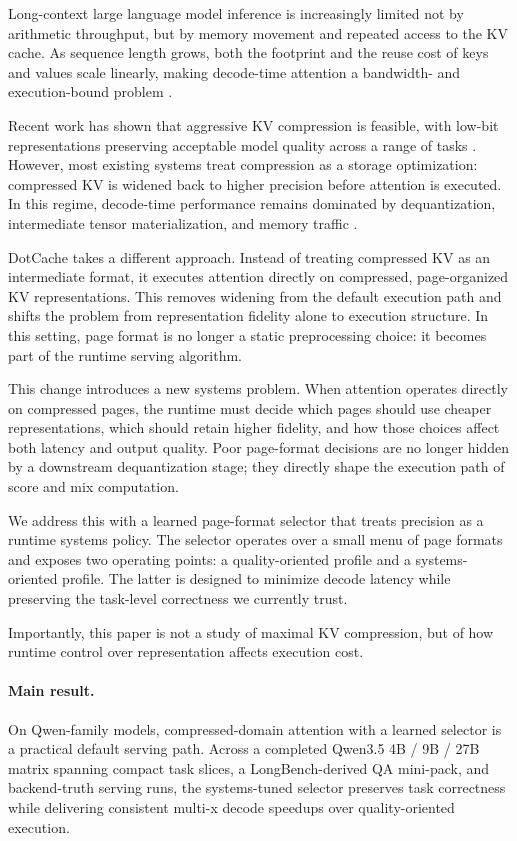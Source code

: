 \documentclass[11pt]{article}
\begin{document}
Long-context large language model inference is increasingly limited not by arithmetic throughput, but by memory movement and repeated access to the KV cache. As sequence length grows, both the footprint and the reuse cost of keys and values scale linearly, making decode-time attention a bandwidth- and execution-bound problem \cite{pagedattention,flashattention,flashattention2,llm_kv_survey}.

Recent work has shown that aggressive KV compression is feasible, with low-bit representations preserving acceptable model quality across a range of tasks \cite{kvquant,kivi,qjl,polarquant,turboquant,innerq}. However, most existing systems treat compression as a storage optimization: compressed KV is widened back to higher precision before attention is executed. In this regime, decode-time performance remains dominated by dequantization, intermediate tensor materialization, and memory traffic \cite{qserve,innerq}.

DotCache takes a different approach. Instead of treating compressed KV as an intermediate format, it executes attention directly on compressed, page-organized KV representations. This removes widening from the default execution path and shifts the problem from representation fidelity alone to execution structure. In this setting, page format is no longer a static preprocessing choice: it becomes part of the runtime serving algorithm.

This change introduces a new systems problem. When attention operates directly on compressed pages, the runtime must decide which pages should use cheaper representations, which should retain higher fidelity, and how those choices affect both latency and output quality. Poor page-format decisions are no longer hidden by a downstream dequantization stage; they directly shape the execution path of score and mix computation.

We address this with a learned page-format selector that treats precision as a runtime systems policy. The selector operates over a small menu of page formats and exposes two operating points: a quality-oriented profile and a systems-oriented profile. The latter is designed to minimize decode latency while preserving the task-level correctness we currently trust.

Importantly, this paper is not a study of maximal KV compression, but of how runtime control over representation affects execution cost.

\paragraph{Main result.}
On Qwen-family models, compressed-domain attention with a learned selector is a practical default serving path. Across a completed Qwen3.5 4B / 9B / 27B matrix spanning compact task slices, a LongBench-derived QA mini-pack, and backend-truth serving runs, the systems-tuned selector preserves task correctness while delivering consistent multi-x decode speedups over quality-oriented execution.
\end{document}
